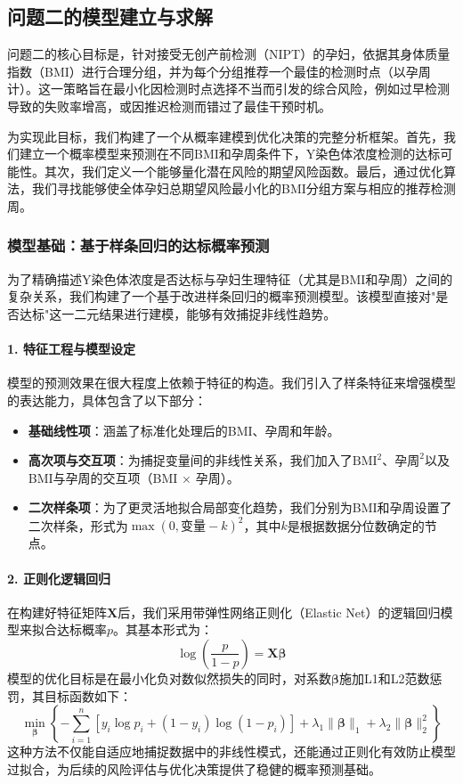 \documentclass[12pt,a4paper]{ctexart}
\numberwithin{equation}{section}
\theoremstyle{mcm}
\begin{document}
\subsection{问题二的模型建立与求解}

问题二的核心目标是，针对接受无创产前检测（NIPT）的孕妇，依据其身体质量指数（BMI）进行合理分组，并为每个分组推荐一个最佳的检测时点（以孕周计）。这一策略旨在最小化因检测时点选择不当而引发的综合风险，例如过早检测导致的失败率增高，或因推迟检测而错过了最佳干预时机。

为实现此目标，我们构建了一个从概率建模到优化决策的完整分析框架。首先，我们建立一个概率模型来预测在不同BMI和孕周条件下，Y染色体浓度检测的达标可能性。其次，我们定义一个能够量化潜在风险的期望风险函数。最后，通过优化算法，我们寻找能够使全体孕妇总期望风险最小化的BMI分组方案与相应的推荐检测周。

\subsubsection{模型基础：基于样条回归的达标概率预测}

为了精确描述Y染色体浓度是否达标与孕妇生理特征（尤其是BMI和孕周）之间的复杂关系，我们构建了一个基于改进样条回归的概率预测模型。该模型直接对"是否达标"这一二元结果进行建模，能够有效捕捉非线性趋势。

\paragraph{1. 特征工程与模型设定}
模型的预测效果在很大程度上依赖于特征的构造。我们引入了样条特征来增强模型的表达能力，具体包含了以下部分：
\begin{itemize}
    \item \textbf{基础线性项}：涵盖了标准化处理后的BMI、孕周和年龄。
    \item \textbf{高次项与交互项}：为捕捉变量间的非线性关系，我们加入了$\text{BMI}^2$、$\text{孕周}^2$以及BMI与孕周的交互项（BMI $\times$ 孕周）。
    \item \textbf{二次样条项}：为了更灵活地拟合局部变化趋势，我们分别为BMI和孕周设置了二次样条，形式为$\max(0, \text{变量} - k)^2$，其中$k$是根据数据分位数确定的节点。
\end{itemize}

\paragraph{2. 正则化逻辑回归}
在构建好特征矩阵$\mathbf{X}$后，我们采用带弹性网络正则化（Elastic Net）的逻辑回归模型来拟合达标概率$p$。其基本形式为：
\begin{equation}
    \log\left(\frac{p}{1-p}\right) = \mathbf{X}\boldsymbol{\beta}
\end{equation}
模型的优化目标是在最小化负对数似然损失的同时，对系数$\boldsymbol{\beta}$施加L1和L2范数惩罚，其目标函数如下：
\begin{equation}
    \min_{\boldsymbol{\beta}} \left\{ -\sum_{i=1}^n \left[ y_i \log p_i + (1-y_i) \log(1-p_i) \right] + \lambda_1 \|\boldsymbol{\beta}\|_1 + \lambda_2 \|\boldsymbol{\beta}\|_2^2 \right\}
\end{equation}
这种方法不仅能自适应地捕捉数据中的非线性模式，还能通过正则化有效防止模型过拟合，为后续的风险评估与优化决策提供了稳健的概率预测基础。
\end{document}
